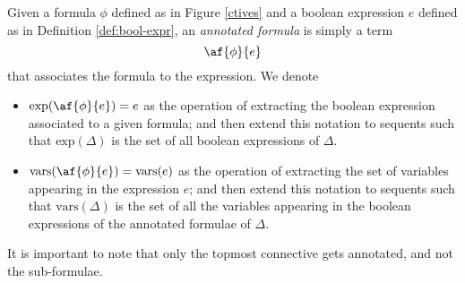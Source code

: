 \begin{define}
	\label{def:annotated}
	Given a formula $\phi$ defined as in Figure \ref{ctives} and a boolean expression $e$ defined as in Definition \ref{def:bool-expr}, an \textit{annotated formula} is simply a term 
	$$ \af{\phi}{e} $$
	that associates the formula to the expression.
	We denote 
	\begin{itemize}
		\item $ \mathrm{exp}(\af{\phi}{e}) = e $
			as the operation of extracting the boolean expression associated to a given formula; and then extend this notation to sequents such that $ \mathrm{exp}(\Delta) $ is the set of all boolean expressions of $\Delta$.
		\item $\mathrm{vars}(\af{\phi}{e}) = \mathrm{vars}(e) $
			as the operation of extracting the set of variables appearing in the expression $e$; and then extend this notation to sequents such that $ \mathrm{vars}(\Delta)$ is the set of all the variables appearing in the boolean expressions of the annotated formulae of $\Delta$.
	\end{itemize}
\end{define}
It is important to note that only the topmost connective gets annotated, and not the sub-formulae.

